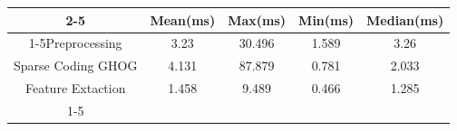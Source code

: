 \documentclass{standalone}
\begin{document}
 
 \begin{tabular}{|c |c |c |c |c |}
\cline{2-5}\cline{2-5} \multicolumn{1}{c |}{ } & Mean(ms) & Max(ms) & Min(ms) & Median(ms)\\ 
\cline{1-5}Preprocessing & 3.23 & 30.496 & 1.589 & 3.26\\ 
 \hhline{|=|=|=|=|=|}Sparse Coding GHOG & 4.131 & 87.879 & 0.781 & 2.033\\ 
 \hhline{|=|=|=|=|=|}Feature Extaction & 1.458 & 9.489 & 0.466 & 1.285\\ 
 \cline{1-5}\hline \end{tabular}
 
\end{document}
